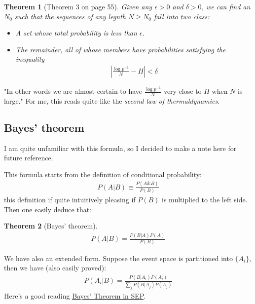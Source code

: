 \documentclass{article}
\numberwithin{equation}{subsection} %
\newtheorem{thm}{Theorem}[section]
\theoremstyle{definition}
\begin{document}
    \begin{thm}[Theorem 3 on page 55]
        Given any $\epsilon >0$ and $\delta >0$, we can find an $N_0$
        such that the sequences of any legnth $N\geq N_0$ fall into
        two class:
        \begin{itemize}
            \item A set whose total probability is less than $\epsilon$.
            \item The remainder, all of whose members have probabilities
                satisfying the inequality
                \begin{align}
                    \label{eq:Entropy_of_info_source:thm3}
                    \left| \frac{\log p^{-1}}{N}-H\right| < \delta
                \end{align}
        \end{itemize}
    \end{thm}
    "In other words we are almost certain to have 
    $\frac{\log p^{-1}}{N}$ very close to $H$ when $N$ is large."
    For me, this reads quite like the \textit{second law of
    thermaldynamics}.


    \subsection{Bayes' theorem}
    \label{sec:Bayes-theorem}
    I am quite unfamiliar with this formula, so I decided to make a note
    here for future reference.

    This formula starts from the definition of conditional probability:
    \begin{align}
        P(A|B)\equiv \frac{P(A\&B)}{P(B)}
    \end{align}
    this definition if quite intuitively pleasing if $P(B)$ is multiplied
    to the left side. Then one easily deduce that:
    \begin{thm}[Bayes' theorem] \begin{align}
        P(A|B)=\frac{P(B|A)P(A)}{P(B)}
    \end{align} \end{thm}

    We have also an extended form. Suppose the event space is partitioned
    into $\{A_i\}$, then we have (also easily proved):
    \begin{align}
        P(A_i|B)=\frac{P(B|A_i)P(A_i)}{\sum_j P(B|A_j)P(A_j)}
    \end{align}
    Here's a good reading \href{http://plato.stanford.edu/entries/bayes-theorem/}{Bayes' Theorem in SEP}.
\end{document}
